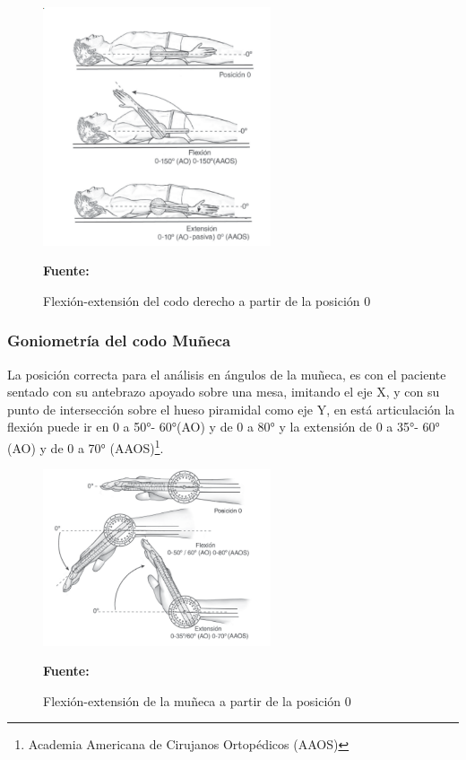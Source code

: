 
\begin{figure}[H]
    \centering
    \includegraphics[width=0.6\textwidth]{Anexos/LATEX/chapters/images/goniometria_codo.png}
    \caption{Flexión-extensión del codo derecho a partir de la posición 0}
    \small{\textbf{Fuente:} \parencite{Taboadela2007TaboadelaLaborales.} }
    \label{GONIOMETRIA_CODO}
\end{figure}

\subsubsection{Goniometría del codo Muñeca}
La posición correcta para el análisis en ángulos de la muñeca, es con el paciente sentado con su antebrazo apoyado sobre una mesa, imitando el eje X, y con su punto de intersección sobre el hueso piramidal como eje Y, en está articulación la flexión puede ir en 0 a 50°- 60°(AO) y de 0 a 80° y la extensión de 0 a 35°- 60° (AO) y de 0 a 70° (AAOS)\footnote{Academia Americana de Cirujanos Ortopédicos (AAOS)}.\parencite{Taboadela2007TaboadelaLaborales.}

\begin{figure}[H]
    \centering
    \includegraphics[width=0.6\textwidth]{Anexos/LATEX/chapters/images/goniometria_muneca.png}
    \caption{Flexión-extensión de la muñeca a partir de la posición 0}
    \small{\textbf{Fuente:} \parencite{Taboadela2007TaboadelaLaborales.} }
    \label{GONIOMETRIA_MUNECA}
\end{figure}


